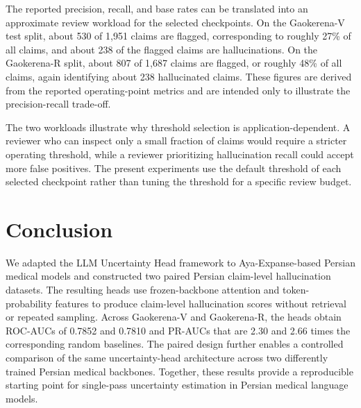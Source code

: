 \documentclass[conference]{IEEEtran}
\begin{document}
The reported precision, recall, and base rates can be translated into an approximate review workload for the selected checkpoints. On the Gaokerena-V test split, about 530 of 1,951 claims are flagged, corresponding to roughly 27\% of all claims, and about 238 of the flagged claims are hallucinations. On the Gaokerena-R split, about 807 of 1,687 claims are flagged, or roughly 48\% of all claims, again identifying about 238 hallucinated claims. These figures are derived from the reported operating-point metrics and are intended only to illustrate the precision-recall trade-off.

The two workloads illustrate why threshold selection is application-dependent. A reviewer who can inspect only a small fraction of claims would require a stricter operating threshold, while a reviewer prioritizing hallucination recall could accept more false positives. The present experiments use the default threshold of each selected checkpoint rather than tuning the threshold for a specific review budget.

\section{Conclusion}
We adapted the LLM Uncertainty Head framework to Aya-Expanse-based Persian medical models and constructed two paired Persian claim-level hallucination datasets. The resulting heads use frozen-backbone attention and token-probability features to produce claim-level hallucination scores without retrieval or repeated sampling. Across Gaokerena-V and Gaokerena-R, the heads obtain ROC-AUCs of 0.7852 and 0.7810 and PR-AUCs that are 2.30 and 2.66 times the corresponding random baselines. The paired design further enables a controlled comparison of the same uncertainty-head architecture across two differently trained Persian medical backbones. Together, these results provide a reproducible starting point for single-pass uncertainty estimation in Persian medical language models.
\end{document}
